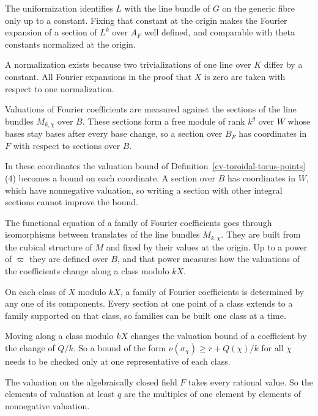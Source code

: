 The uniformization identifies $L$ with the line bundle of $G$ on the generic fibre only up to a constant.
Fixing that constant at the origin makes the Fourier expansion of a section of $L^k$ over $A_F$ well
defined, and comparable with theta constants normalized at the origin.

A normalization exists because two trivializations of one line over $K$ differ by a constant. All Fourier
expansions in the proof that $X$ is zero are taken with respect to one normalization.

Valuations of Fourier coefficients are measured against the sections of the line bundles $M_{k,\chi}$ over
$B$. These sections form a free module of rank $k^g$ over $W$ whose bases stay bases after every base
change, so a section over $B_F$ has coordinates in $F$ with respect to sections over $B$.

In these coordinates the valuation bound of Definition~\ref{cv-toroidal-torus-points}(4) becomes a bound on
each coordinate. A section over $B$ has coordinates in $W$, which have nonnegative valuation, so writing a
section with other integral sections cannot improve the bound.

The functional equation of a family of Fourier coefficients goes through isomorphisms between translates of
the line bundles $M_{k,\chi}$. They are built from the cubical structure of $M$ and fixed by their values at
the origin. Up to a power of $\varpi$ they are defined over $B$, and that power measures how the
valuations of the coefficients change along a class modulo $kX$.

On each class of $X$ modulo $kX$, a family of Fourier coefficients is determined by any one of its
components. Every section at one point of a class extends to a family supported on that class, so families
can be built one class at a time.

Moving along a class modulo $kX$ changes the valuation bound of a coefficient by the change of $Q/k$. So a
bound of the form $\nu(\sigma_\chi)\ge r+Q(\chi)/k$ for all $\chi$ needs to be checked only at one
representative of each class.

The valuation on the algebraically closed field $F$ takes every rational value. So the elements of
valuation at least $q$ are the multiples of one element by elements of nonnegative valuation.


